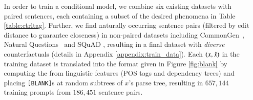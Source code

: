 




In order to train a conditional model,
we combine six existing datasets with paired sentences, each containing a subset of the desired phenomena in Table \ref{table:ctrltag}. Further, we find naturally occurring sentence pairs (filtered by edit distance to guarantee closeness) in non-paired datasets including CommonGen~\cite{lin-etal-2020-commongen}, Natural Questions~\cite{kwiatkowski-etal-2019-natural} and SQuAD \cite{rajpurkar-etal-2016-squad}, resulting in a final dataset with \emph{diverse} counterfactuals (details in Appendix \ref{appendix:train_data}). 
Each $(x, \hat{x})$ in the training dataset is translated into the format given in Figure \ref{fig:blank} by computing the \tagstr from linguistic features (POS tags and dependency trees) and placing \texttt{[BLANK]}s at random subtrees of $x$'s parse tree, resulting in $657,144$ training prompts from $186,451$ sentence pairs.


